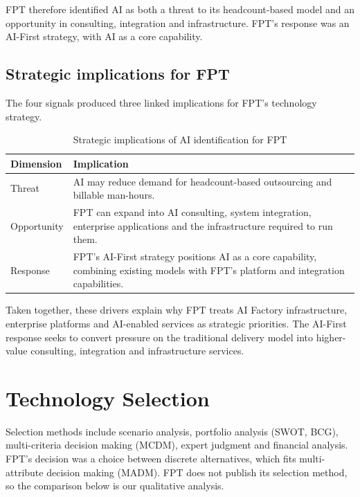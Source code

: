 \documentclass[a4paper,12pt]{report}
\begin{document}
FPT therefore identified AI as both a threat to its headcount-based model and an opportunity in consulting, integration 
and infrastructure.
FPT's response was an AI-First strategy, with AI as a core capability.

\section{Strategic implications for FPT}
The four signals produced three linked implications for FPT's technology strategy.

\begin{table}[H]
\centering
\caption{Strategic implications of AI identification for FPT}
\label{tab:ai-identification}
\begin{tabular}{p{} p{}}
\toprule
\textbf{Dimension} & \textbf{Implication} \\
\midrule
Threat & AI may reduce demand for headcount-based outsourcing and billable man-hours. \\
Opportunity & FPT can expand into AI consulting, system integration, enterprise applications and the infrastructure required to run them. \\
Response & FPT's AI-First strategy positions AI as a core capability, combining existing models with FPT's platform and integration capabilities. \\
\bottomrule
\end{tabular}
\end{table}

Taken together, these drivers explain why FPT treats AI Factory infrastructure, enterprise platforms and AI-enabled services as strategic priorities. The AI-First response seeks to convert pressure on the traditional delivery model into higher-value consulting, integration and infrastructure services.


\chapter{Technology Selection}

Selection methods include scenario analysis, portfolio analysis (SWOT, BCG), multi-criteria decision making (MCDM), 
expert judgment and financial analysis. FPT's decision was a choice between discrete alternatives, which fits multi-attribute 
decision making (MADM). FPT does not publish its selection method, so the comparison below is our qualitative analysis.
\end{document}
